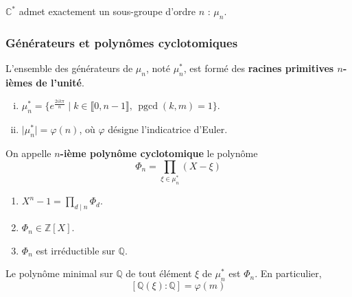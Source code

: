 	
	\begin{proposition}
		$\mathbb{C}^*$ admet exactement un sous-groupe d'ordre $n$ : $\mu_n$.
	\end{proposition}
	
	\newpage
	
	\subsubsection{Générateurs et polynômes cyclotomiques}
	
	
	\begin{definition}
		L'ensemble des générateurs de $\mu_n$, noté $\mu_n^*$, est formé des \textbf{racines primitives $n$-ièmes de l'unité}.
	\end{definition}
	
	\begin{proposition}
		\begin{enumerate}[(i)]
			\item $\mu_n^* = \{ e^{\frac{2ik\pi}{n}} \mid k \in \llbracket 0, n-1 \rrbracket, \, \operatorname{pgcd}(k, m) = 1 \}$.
			\item $\vert \mu_n^* \vert = \varphi(n)$, où $\varphi$ désigne l'indicatrice d'Euler.
		\end{enumerate}
	\end{proposition}
	
	\begin{definition}
		On appelle \textbf{$n$-ième polynôme cyclotomique} le polynôme
		\[ \Phi_n = \prod_{\xi \in \mu_n^*} (X - \xi) \]
	\end{definition}
	
	\begin{theorem}
		\begin{enumerate}
			\item $X^n - 1 = \prod_{d \mid n} \Phi_d$.
			\item $\Phi_n \in \mathbb{Z}[X]$.
			\item $\Phi_n$ est irréductible sur $\mathbb{Q}$.
		\end{enumerate}
	\end{theorem}
	
	\begin{corollary}
		Le polynôme minimal sur $\mathbb{Q}$ de tout élément $\xi$ de $\mu_n^*$ est $\Phi_n$. En particulier,
		\[ [\mathbb{Q}(\xi):\mathbb{Q}]=\varphi(m) \]
	\end{corollary}
	
